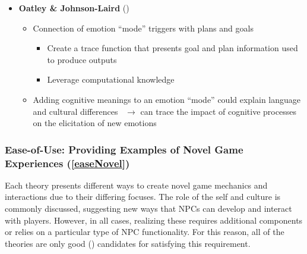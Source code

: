\begin{itemize}
    \item \textbf{Oatley \& Johnson-Laird} (\strong)
    \begin{itemize}
        \item Connection of emotion ``mode'' triggers with plans and
        goals~\citep[p.~36]{oatley1987towards}
        \begin{itemize}
            \item Create a trace function that presents goal and plan
            information used to produce outputs

            \item Leverage computational knowledge
        \end{itemize}

        \item Adding cognitive meanings to an emotion ``mode'' could explain
        language and cultural differences~\citep[p.~218]{johnson1992basic}
        $\rightarrow$ can trace the impact of cognitive processes on the
        elicitation of new emotions
    \end{itemize}
\end{itemize}

\subsubsection{Ease-of-Use: Providing Examples of Novel Game Experiences
    (\ref{easeNovel})}
Each theory presents different ways to create novel game mechanics and
interactions due to their differing focuses. The role of the self and culture
is commonly discussed, suggesting new ways that NPCs can develop and interact
with players. However, in all cases, realizing these requires additional
components or relies on a particular type of NPC functionality. For this
reason, all of the theories are only good (\good) candidates for satisfying
this requirement.

